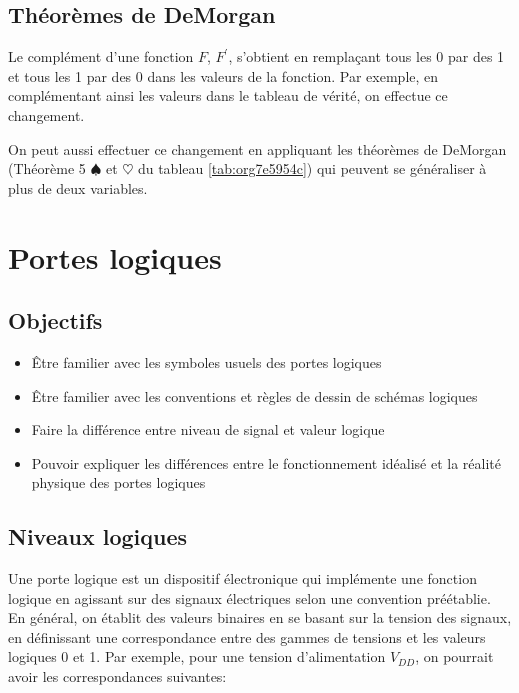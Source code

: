 \documentclass[11pt]{article}
\begin{document}
\subsection{Théorèmes de DeMorgan}
\label{sec:org5dcdeca}

Le complément d'une fonction \(F\), \(F^\prime\), s'obtient en
remplaçant tous les 0 par des 1 et tous les 1 par des 0 dans les
valeurs de la fonction. Par exemple, en complémentant ainsi les
valeurs dans le tableau de vérité, on effectue ce changement.

On peut aussi effectuer ce changement en appliquant les théorèmes de
DeMorgan (Théorème 5 \(\spadesuit\) et \(\heartsuit\) du tableau \ref{tab:org7e5954c}) qui
peuvent se généraliser à plus de deux variables.

\section{Portes logiques}
\label{sec:org2443e8d}

\subsection{Objectifs}
\label{sec:org22e2a04}
\begin{itemize}
\item Être familier avec les symboles usuels des portes logiques
\item Être familier avec les conventions et règles de dessin de schémas
logiques
\item Faire la différence entre niveau de signal et valeur logique
\item Pouvoir expliquer les différences entre le fonctionnement idéalisé
et la réalité physique des portes logiques
\end{itemize}

\subsection{Niveaux logiques}
\label{sec:org2eb589a}

Une porte logique est un dispositif électronique qui implémente une
fonction logique en agissant sur des signaux électriques selon une
convention préétablie. En général, on établit des valeurs binaires en
se basant sur la tension des signaux, en définissant une
correspondance entre des gammes de tensions et les valeurs logiques 0
et 1. Par exemple, pour une tension d'alimentation \(V_{DD}\), on
pourrait avoir les correspondances suivantes:
\end{document}
